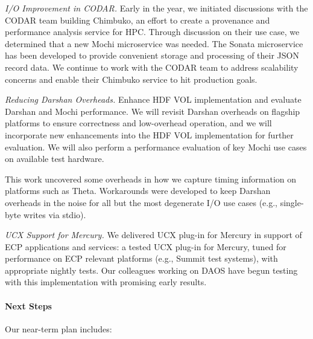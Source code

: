 \emph{I/O Improvement in CODAR.}
%
Early in the year, we initiated discussions with the CODAR team building
Chimbuko, an effort to create a provenance and performance analysis service for
HPC. Through discussion on their use case, we determined that a new Mochi
microservice was needed. The Sonata microservice has been developed to provide
convenient storage and processing of their JSON record data. We continue to work with
the CODAR team to address scalability concerns and enable their Chimbuko service
to hit production goals.

\emph{Reducing Darshan Overheads.} Enhance HDF VOL implementation and evaluate
Darshan and Mochi
performance. We will revisit Darshan overheads on flagship platforms to ensure
correctness and low-overhead operation, and we will incorporate new
enhancements into the HDF VOL implementation for further evaluation. We will
also perform a performance evaluation of key Mochi use cases on available test
hardware.

This work uncovered some overheads in how we capture timing information
on platforms such as Theta. Workarounds were developed to keep
Darshan overheads in the noise for all but the most degenerate I/O
use cases (e.g., single-byte writes via stdio).

\emph{UCX Support for Mercury.} We delivered UCX plug-in for Mercury
in support of ECP applications and services: a tested UCX plug-in
for Mercury, tuned for performance on ECP relevant platforms (e.g.,
Summit test systems), with appropriate nightly tests. Our colleagues
working on DAOS have begun testing with this implementation with
promising early results.

\paragraph{Next Steps}

Our near-term plan includes:



